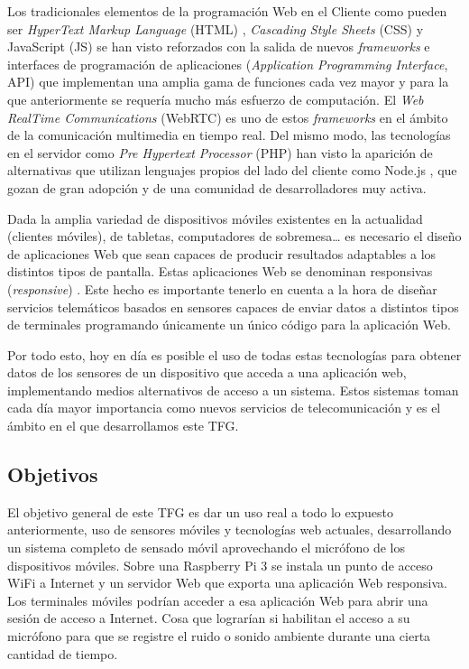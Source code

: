 Los tradicionales elementos de la programación Web en el Cliente como pueden ser \emph{HyperText Markup Language} (\acrshort{HTML}) \cite{HTML5}, \emph{Cascading Style Sheets} (\acrshort{CSS}) \cite{HTML5CSS3} y JavaScript \cite{FrontEndBNR, LibroNode2} (\acrshort{JS}) se han visto reforzados con la salida de nuevos \emph{frameworks} e interfaces de programación de aplicaciones (\emph{Application Programming Interface}, \acrshort{API}) que implementan una amplia gama de funciones cada vez mayor y para la que anteriormente se requería mucho más esfuerzo de computación. El \emph{Web RealTime Communications} (\acrshort{WebRTC}) \cite{LibroWebRTC1} es uno de estos \emph{frameworks} en el ámbito de la comunicación multimedia en tiempo real. Del mismo modo, las tecnologías en el servidor como \emph{Pre Hypertext Processor} (\acrshort{PHP}) \cite{PHPMySQLJavaScript} han visto la aparición de alternativas que utilizan lenguajes propios del lado del cliente como Node.js \cite{LibroNode1}, que gozan de gran adopción y de una comunidad de desarrolladores muy activa.

Dada la amplia variedad de dispositivos móviles existentes en la actualidad (clientes móviles), de tabletas, computadores de sobremesa… es necesario el diseño de aplicaciones Web que sean capaces de producir resultados adaptables a los distintos tipos de pantalla. Estas aplicaciones Web se denominan responsivas (\emph{responsive}) \cite{ResponsiveWD}. Este hecho es importante tenerlo en cuenta a la hora de diseñar servicios telemáticos basados en sensores capaces de enviar datos a distintos tipos de terminales programando únicamente un único código para la aplicación Web.

Por todo esto, hoy en día es posible el uso de todas estas tecnologías para obtener datos de los sensores de un dispositivo que acceda a una aplicación web, implementando medios alternativos de acceso a un sistema. Estos sistemas toman cada día mayor importancia como nuevos servicios de telecomunicación y es el ámbito en el que desarrollamos este TFG.

\subsection{Objetivos}

El objetivo general de este TFG es dar un uso real a todo lo expuesto anteriormente, uso de sensores móviles y tecnologías web actuales, desarrollando un sistema completo de sensado móvil aprovechando el micrófono de los dispositivos móviles. Sobre una Raspberry Pi 3 se instala un punto de acceso WiFi a Internet y un servidor Web que exporta una aplicación Web responsiva. Los terminales móviles podrían acceder a esa aplicación Web para abrir una sesión de acceso a Internet. Cosa que lograrían si habilitan el acceso a su micrófono para que se registre el ruido o sonido ambiente durante una cierta cantidad de tiempo.
 
